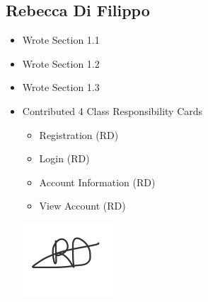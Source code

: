 \documentclass[]{article}
\begin{document}
\subsection{Rebecca Di Filippo}
\begin{itemize}
    \item Wrote Section 1.1
    \item Wrote Section 1.2
    \item Wrote Section 1.3
    \item Contributed 4 Class Responsibility Cards
    \begin{itemize}
        \item Registration (RD)
        \item Login (RD)
        \item Account Information (RD)
        \item View Account (RD)
    \end{itemize}
    \begin{center}
        \includegraphics[scale=0.7]{rebecca.png}
    \end{center}
\end{itemize}
\end{document}
